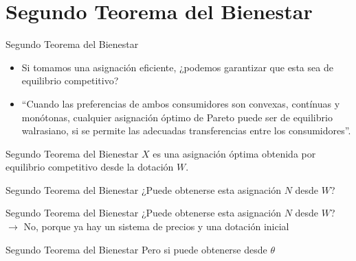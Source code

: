 \section{Segundo Teorema del Bienestar}

\begin{frame}{Segundo Teorema del Bienestar}
	\begin{itemize}
		\item Si tomamos una asignación eficiente, ¿podemos garantizar que esta sea de equilibrio competitivo?
		\item ``Cuando las preferencias de ambos consumidores son convexas, contínuas y monótonas, cualquier asignación óptimo de Pareto puede ser de equilibrio walrasiano, si se permite las adecuadas transferencias entre los consumidores''.
	\end{itemize}
\end{frame}
\begin{frame}{Segundo Teorema del Bienestar}
$X$	es una asignación óptima obtenida por equilibrio competitivo desde la dotación $W$.
	\begin{center}
		
	\end{center}
\end{frame}
\begin{frame}{Segundo Teorema del Bienestar}
¿Puede obtenerse esta asignación $N$ desde $W$? 
	\begin{center}
		
	\end{center}
\end{frame}
\begin{frame}{Segundo Teorema del Bienestar}
¿Puede obtenerse esta asignación $N$ desde $W$? $\longrightarrow$ No, porque ya hay un sistema de precios y una dotación inicial
	\begin{center}
		
	\end{center}
\end{frame}
\begin{frame}{Segundo Teorema del Bienestar}
Pero si puede obtenerse desde $\theta$
	\begin{center}
		
	\end{center}
\end{frame}
